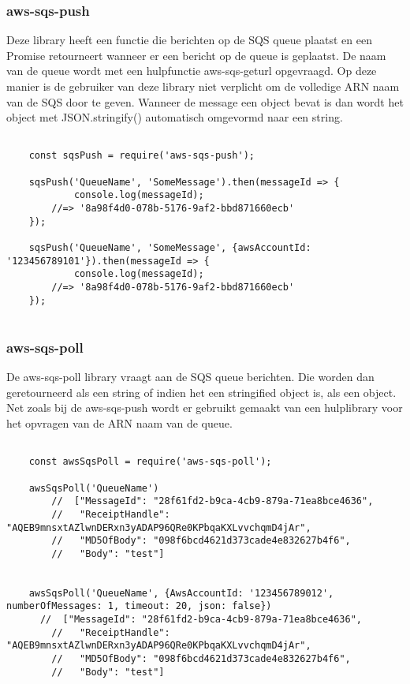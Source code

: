 \subsubsection{aws-sqs-push}
Deze library heeft een functie die berichten op de SQS queue plaatst en een Promise retourneert wanneer er een bericht op de queue is geplaatst. De naam van de queue wordt met een hulpfunctie aws-sqs-geturl opgevraagd. Op deze manier is de gebruiker van deze library niet verplicht om de volledige ARN naam van de SQS door te geven. Wanneer de message een object bevat is dan wordt het object met JSON.stringify() automatisch omgevormd naar een string.

\begin{lstlisting}[caption=Voorbeeld dat data plaatst op een SQS queue met behulp van de aws-sqs-push library]

	const sqsPush = require('aws-sqs-push');

	sqsPush('QueueName', 'SomeMessage').then(messageId => {
    		console.log(messageId);
    	//=> '8a98f4d0-078b-5176-9af2-bbd871660ecb'
	});

	sqsPush('QueueName', 'SomeMessage', {awsAccountId: '123456789101'}).then(messageId => {
    		console.log(messageId);
    	//=> '8a98f4d0-078b-5176-9af2-bbd871660ecb'
	});
	
\end{lstlisting}
\clearpage
\subsubsection{aws-sqs-poll}
De aws-sqs-poll library vraagt aan de SQS queue berichten. Die worden dan geretourneerd als een string of indien het een stringified object is, als een object. Net zoals bij de aws-sqs-push wordt er gebruikt gemaakt van een hulplibrary voor het opvragen van de ARN naam van de queue.

\begin{lstlisting}[caption=Voorbeeld hoe berichten worden opgehaald van de SQS queue]

	const awsSqsPoll = require('aws-sqs-poll');

	awsSqsPoll('QueueName')
    	//  ["MessageId": "28f61fd2-b9ca-4cb9-879a-71ea8bce4636",
    	//   "ReceiptHandle": "AQEB9mnsxtAZlwnDERxn3yADAP96QRe0KPbqaKXLvvchqmD4jAr",
    	//   "MD5OfBody": "098f6bcd4621d373cade4e832627b4f6",
    	//   "Body": "test"]


	awsSqsPoll('QueueName', {AwsAccountId: '123456789012', numberOfMessages: 1, timeout: 20, json: false})
  	  //  ["MessageId": "28f61fd2-b9ca-4cb9-879a-71ea8bce4636",
    	//   "ReceiptHandle": "AQEB9mnsxtAZlwnDERxn3yADAP96QRe0KPbqaKXLvvchqmD4jAr",
    	//   "MD5OfBody": "098f6bcd4621d373cade4e832627b4f6",
    	//   "Body": "test"]
	
\end{lstlisting}

